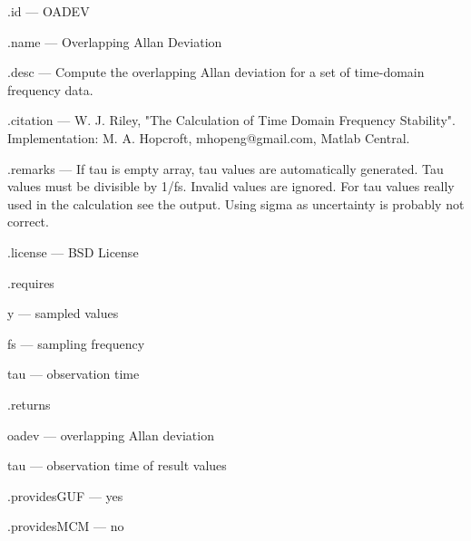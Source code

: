 \begin{tightdesc}
\item [\textsf{.id}] --- OADEV
\item [\textsf{.name}] --- Overlapping Allan Deviation
\item [\textsf{.desc}] --- Compute the overlapping Allan deviation for a set of time-domain frequency data.
\item [\textsf{.citation}] --- W. J. Riley, "The Calculation of Time Domain Frequency Stability". Implementation: M. A. Hopcroft, mhopeng@gmail.com, Matlab Central.
\item [\textsf{.remarks}] --- If tau is empty array, tau values are automatically generated. Tau values must be divisible by 1/fs. Invalid values are ignored. For tau values really used in the calculation see the output. Using sigma as uncertainty is probably not correct.
\item [\textsf{.license}] --- BSD License
\item [\textsf{.requires}] \rule{0em}{0em}
\begin{tightdesc}
\item [\textsf{y}] --- sampled values
\item [\textsf{fs}] --- sampling frequency
\item [\textsf{tau}] --- observation time
\end{tightdesc}
\item [\textsf{.returns}] \rule{0em}{0em}
\begin{tightdesc}
\item [\textsf{oadev}] --- overlapping Allan deviation
\item [\textsf{tau}] --- observation time of result values
\end{tightdesc}
\item [\textsf{.providesGUF}] --- yes
\item [\textsf{.providesMCM}] ---  no
\end{tightdesc}
